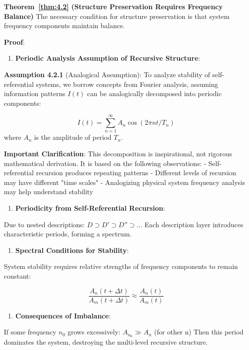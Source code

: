 \textbf{Theorem~\ref{thm:4.2} (Structure Preservation Requires Frequency Balance)}
\label{thm:4.2}
The necessary condition for structure preservation is that system frequency components maintain balance.

\textbf{Proof}:

\begin{enumerate}
\item \textbf{Periodic Analysis Assumption of Recursive Structure}:
\end{enumerate}
   
   \textbf{Assumption 4.2.1} (Analogical Assumption): To analyze stability of self-referential systems, we borrow concepts from Fourier analysis, assuming information patterns $I(t)$ can be analogically decomposed into periodic components:
   
\begin{equation}
I(t) = \sum_{n=1}^{\infty} A_n \cos(2\pi nt/T_n)
\end{equation}
   where $A_n$ is the amplitude of period $T_n$.
   
   \textbf{Important Clarification}: This decomposition is inspirational, not rigorous mathematical derivation. It is based on the following observations:
   - Self-referential recursion produces repeating patterns
   - Different levels of recursion may have different "time scales"
   - Analogizing physical system frequency analysis may help understand stability
   
\begin{enumerate}
\item \textbf{Periodicity from Self-Referential Recursion}:
\end{enumerate}
   Due to nested descriptions: $D \supset D' \supset D'' \supset ...$
   Each description layer introduces characteristic periods, forming a spectrum.
   
\begin{enumerate}
\item \textbf{Spectral Conditions for Stability}:
\end{enumerate}
   System stability requires relative strengths of frequency components to remain constant:
   
\begin{equation}
\frac{A_n(t+\Delta t)}{A_m(t+\Delta t)} \approx \frac{A_n(t)}{A_m(t)}
\end{equation}

\begin{enumerate}
\item \textbf{Consequences of Imbalance}:
\end{enumerate}
   If some frequency $n_0$ grows excessively: $A_{n_0} \gg A_n$ (for other n)
   Then this period dominates the system, destroying the multi-level recursive structure.

